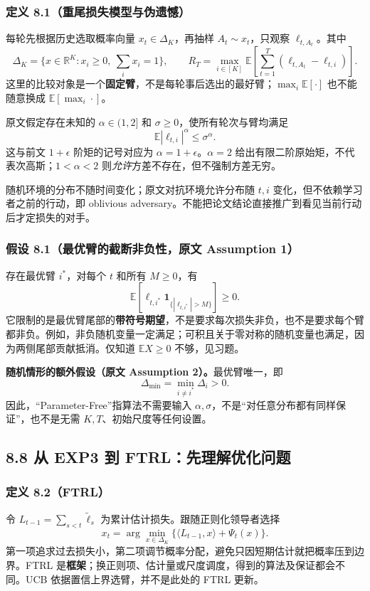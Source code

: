 \subsubsection{定义 8.1（重尾损失模型与伪遗憾）}
每轮先根据历史选取概率向量 $x_t\in\Delta_K$，再抽样 $A_t\sim x_t$，只观察 $\ell_{t,A_t}$。其中
\[
\Delta_K=\{x\in\mathbb R^K:x_i\ge0,\ \sum_i x_i=1\},\qquad
R_T=\max_{i\in[K]}\mathbb E\!\left[\sum_{t=1}^T(\ell_{t,A_t}-\ell_{t,i})\right].
\]
这里的比较对象是一个\textbf{固定臂}，不是每轮事后选出的最好臂；$\max_i\mathbb E[\cdot]$ 也不能随意换成 $\mathbb E[\max_i\cdot]$。

原文假定存在未知的 $\alpha\in(1,2]$ 和 $\sigma\ge0$，使所有轮次与臂均满足
\[
\mathbb E|\ell_{t,i}|^\alpha\le\sigma^\alpha.
\]
这与前文 $1+\epsilon$ 阶矩的记号对应为 $\alpha=1+\epsilon$。$\alpha=2$ 给出有限二阶原始矩，不代表次高斯；$1<\alpha<2$ 则\emph{允许}方差不存在，但不强制方差无穷。

随机环境的分布不随时间变化；原文对抗环境允许分布随 $t,i$ 变化，但不依赖学习者之前的行动，即 oblivious adversary。不能把论文结论直接推广到看见当前行动后才定损失的对手。

\subsubsection{假设 8.1（最优臂的截断非负性，原文 Assumption 1）}
存在最优臂 $i^*$，对每个 $t$ 和所有 $M\ge0$，有
\[
\mathbb E[\ell_{t,i^*}\mathbf1_{\{|\ell_{t,i^*}|>M\}}]\ge0.
\]
它限制的是最优臂尾部的\textbf{带符号期望}，不是要求每次损失非负，也不是要求每个臂都非负。例如，非负随机变量一定满足；可积且关于零对称的随机变量也满足，因为两侧尾部贡献抵消。仅知道 $\mathbb EX\ge0$ 不够，见习题。

\textbf{随机情形的额外假设（原文 Assumption 2）。}最优臂唯一，即
\[
\Delta_{\min}=\min_{i\ne i^*}\Delta_i>0.
\]
因此，“Parameter-Free”指算法不需要输入 $\alpha,\sigma$，不是“对任意分布都有同样保证”，也不是无需 $K,T$、初始尺度等任何设置。

\subsection{8.8 从 EXP3 到 FTRL：先理解优化问题}

\subsubsection{定义 8.2（FTRL）}
令 $L_{t-1}=\sum_{s<t}\widetilde\ell_s$ 为累计估计损失。跟随正则化领导者选择
\[
x_t=\arg\min_{x\in\Delta_K}\{\langle L_{t-1},x\rangle+\Psi_t(x)\}.
\]
第一项追求过去损失小，第二项调节概率分配，避免只因短期估计就把概率压到边界。FTRL 是\textbf{框架}；换正则项、估计量或尺度调度，得到的算法及保证都会不同。UCB 依据置信上界选臂，并不是此处的 FTRL 更新。

